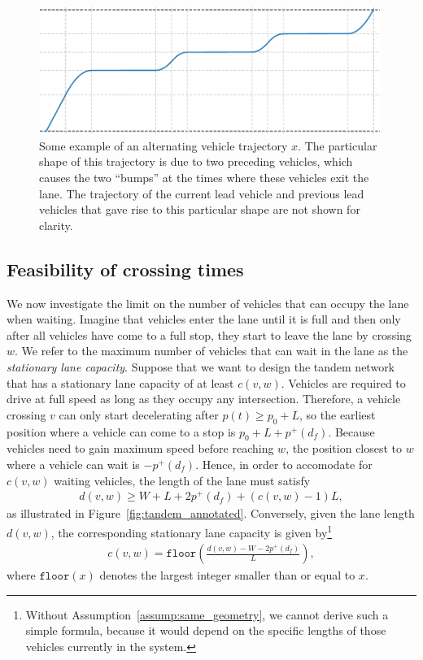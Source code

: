 \documentclass[a4paper]{article}
\theoremstyle{definition}
\theoremstyle{plain}
\begin{document}
\begin{figure}
  \centering
  \includegraphics[width=0.99\textwidth]{figures/motion/tandem_trajectory}
  \caption{Some example of an alternating vehicle trajectory $x$. The particular
    shape of this trajectory is due to two preceding vehicles, which causes the
    two ``bumps'' at the times where these vehicles exit the lane. The
    trajectory of the current lead vehicle and previous lead vehicles that gave
    rise to this particular shape are not shown for clarity.}
  \label{fig:tandem_trajectory}
\end{figure}


\subsection{Feasibility of crossing times}

We now investigate the limit on the number of vehicles that can occupy the lane
when waiting. Imagine that vehicles enter the lane until it is full and then
only after all vehicles have come to a full stop, they start to leave the lane
by crossing $w$. We refer to the maximum number of vehicles that can wait in the
lane as the \textit{stationary lane capacity}.
%
Suppose that we want to design the tandem network that has a stationary lane
capacity of at least $c(v,w)$. Vehicles are required to drive at full speed as
long as they occupy any intersection. Therefore, a vehicle crossing $v$ can only
start decelerating after $p(t) \geq p_{0} + L$, so the earliest position where a
vehicle can come to a stop is $p_{0} + L + p^{+}(d_{f})$.
%
Because vehicles need to gain maximum speed before reaching $w$,
the position closest to $w$ where a vehicle can wait is $- p^{+}(d_{f})$.
%
Hence, in order to accomodate for $c(v,w)$ waiting vehicles, the length of the
lane must satisfy
\begin{align*}
  d(v, w) \geq W + L + 2p^{+}(d_{f}) + (c(v,w) - 1) L ,
\end{align*}
as illustrated in Figure~\ref{fig:tandem_annotated}.
%
Conversely, given the lane length $d(v,w)$, the corresponding stationary lane
capacity is given by\footnote{Without Assumption~\ref{assump:same_geometry}, we
  cannot derive such a simple formula, because it would depend on the specific
  lengths of those vehicles currently in the system.}
\begin{align*}
  c(v, w) = \texttt{floor}\left( \frac{d(v,w) - W - 2 p^{+}(d_{f})}{L} \right) ,
\end{align*}
where $\texttt{floor}(x)$ denotes the largest integer smaller than or equal to
$x$.
\end{document}
